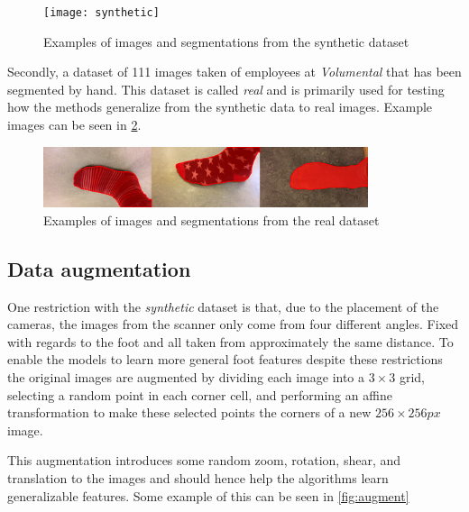\documentclass{kththesis}
\begin{document}
\begin{figure}[h]
  \centering
  \texttt{[image: synthetic]}
  \caption{Examples of images and segmentations from the synthetic dataset}
  \label{fig:data_synthetic}
\end{figure}

Secondly, a dataset of 111 images taken of employees at \textit{Volumental} that
has been segmented by hand. This dataset is called \textit{real} and is
primarily used for testing how the methods generalize from the synthetic data to
real images. Example images can be seen in \cref{fig:data_real}.

\begin{figure}[h]
  \centering
  \includegraphics[width=0.85\textwidth]{real}
  \caption{Examples of images and segmentations from the real dataset}
  \label{fig:data_real}
\end{figure}

\subsection{Data augmentation}
One restriction with the \textit{synthetic} dataset is that, due to the
placement of the cameras, the images from the
scanner only come from four different angles. Fixed with regards to the
foot and all taken from approximately the same
distance. To enable the models to learn more general foot features despite
these restrictions the original images are augmented by dividing each image into
a \(3\times3\) grid, selecting a random point in each corner cell, and
performing an affine transformation to make these selected points the corners of
a new \(256\times256 \textit{px}\) image.

This augmentation introduces some random zoom, rotation, shear, and translation
to the images and should hence help the algorithms learn generalizable features.
Some example of this can be seen in \cref{fig:augment}
\end{document}
